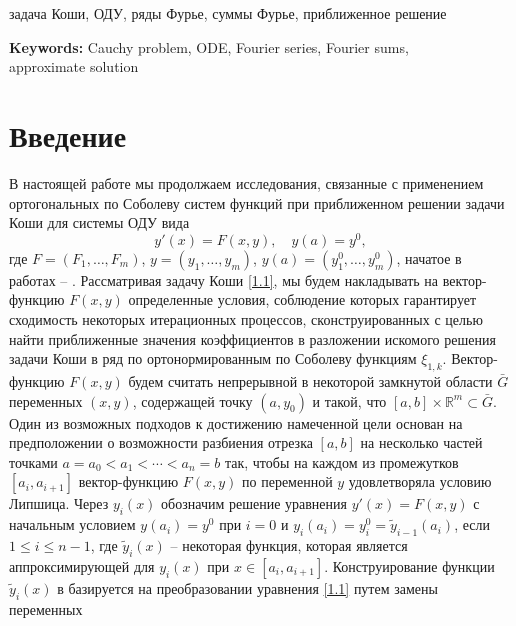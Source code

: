 \documentclass{article}
\numberwithin{equation}{section}
\theoremstyle{plain}
\theoremstyle{definition}
\begin{document}
\begin{fulltext}
\begin{keywords}
	задача Коши, ОДУ, ряды Фурье, суммы Фурье, приближенное решение
	
	{\bf Keywords:}
	Cauchy problem, ODE, Fourier series, Fourier sums, \\ approximate solution
\end{keywords}










\section{Введение}\label{s1}
В настоящей работе мы продолжаем исследования, связанные с применением ортогональных по Соболеву систем функций при приближенном решении задачи Коши для системы ОДУ вида
\begin{equation}\label{1.1}
y'(x)=F(x,y), \quad y(a)=y^0,
\end{equation}
где $F=(F_1,\ldots,F_m)$, $y=(y_1,\ldots,y_m)$, $y(a)=(y_1^0,\ldots,y_m^0)$,
начатое в работах \cite{SharDagElec7} -- \cite{SharIzv2018}.
  Рассматривая задачу Коши \eqref{1.1}, мы будем накладывать на вектор-функцию   $F(x,y)$ определенные условия, соблюдение которых гарантирует сходимость некоторых итерационных процессов, сконструированных с целью найти приближенные  значения коэффициентов  в разложении искомого решения задачи Коши в ряд  по ортонормированным по Соболеву   функциям $\xi_{1,k}$. Вектор-функцию   $F(x,y)$  будем считать непрерывной в некоторой замкнутой  области $\bar G$ переменных $(x,y)$, содержащей точку $(a,y_0)$ и такой, что  $[a,b]\times\mathbb{R}^m\subset\bar G$.  Один из возможных подходов к достижению намеченной цели основан на предположении о возможности  разбиения отрезка $[a,b]$ на несколько частей точками $a=a_0<a_1<\cdots<a_n=b$ так, чтобы на каждом из промежутков $[a_i,a_{i+1}]$ вектор-функцию   $F(x,y)$ по переменной $y$ удовлетворяла условию Липшица. Через $y_i(x)$ обозначим решение уравнения $y'(x)=F(x,y)$ с начальным условием $y(a_i)= y^0$ при $i=0$ и  $y_i(a_i)= y_i^0= \tilde y_{i-1}(a_i)$,  если $1\le i\le n-1$, где $\tilde y_i(x)$ -- некоторая функция, которая является аппроксимирующей для $y_i(x)$ при $x\in[a_i,a_{i+1}]$.   Конструирование функции $\tilde y_i(x)$  в \cite{SharDagElec7,SharMagDagElec8}  базируется на преобразовании уравнения \eqref{1.1} путем замены переменных

\end{fulltext}
\end{document}
